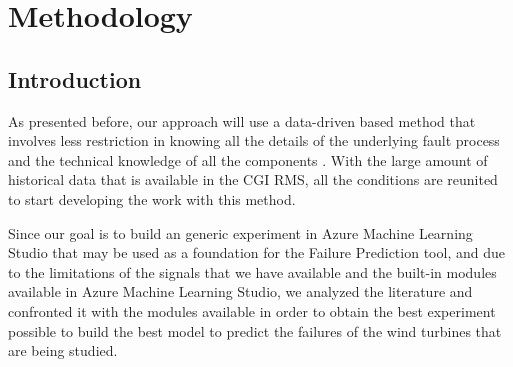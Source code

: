 


\chapter{Methodology}
\label{cha:introduction}

\section{Introduction} 
\label{sub:if_you_use_this_template} 

As presented before, our approach will use a data-driven based method that involves less restriction in knowing all the details of the underlying fault process and the technical knowledge of all the components \cite{OLD_19_WIND}. With the large amount of historical data that is available in the CGI RMS, all the conditions are reunited to start developing the work with this method.

Since our goal is to build an generic experiment in Azure Machine Learning Studio that may be used as a foundation for the Failure Prediction tool, and due to the limitations of the signals that we have available and the built-in modules available in Azure Machine Learning Studio, we analyzed the literature and confronted it with the modules available in order to obtain the best experiment possible to build the best model to predict the failures of the wind turbines that are being studied.




